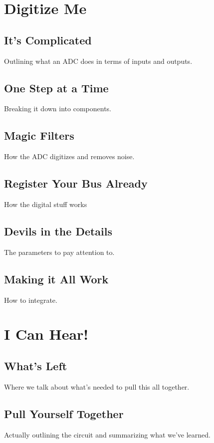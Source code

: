 \documentclass[12pt,a6paper]{book}
\begin{document}
\chapter{Digitize Me}
\section{It's Complicated}
Outlining what an ADC does in terms of inputs and outputs.
\section{One Step at a Time}
Breaking it down into components.
\section{Magic Filters}
How the ADC digitizes and removes noise.
\section{Register Your Bus Already}
How the digital stuff works
\section{Devils in the Details}
The parameters to pay attention to.
\section{Making it All Work}
How to integrate.

\newpage
\chapter{I Can Hear!}
\section{What's Left}
Where we talk about what's needed to pull this all together.
\section{Pull Yourself Together}
Actually outlining the circuit and summarizing what we've learned.

\newpage



\end{document}
